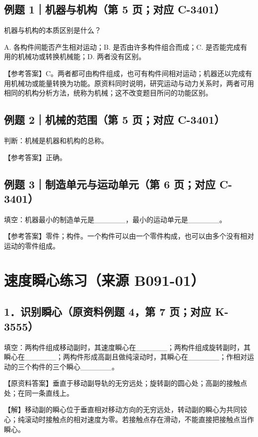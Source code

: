 \documentclass[zihao=5,a4paper,UTF8,fontset=fandol]{ctexart}
\begin{document}
\subsection{例题 1｜机器与机构（第 5 页；对应 C-3401）}

机器与机构的本质区别是什么？


A. 各构件间能否产生相对运动；B. 是否由许多构件组合而成；C. 是否能完成有用的机械功或转换机械能；D. 两者没有区别。


【参考答案】C。两者都可由构件组成，也可有构件间相对运动；机器还以完成有用机械功或能量转换为功能。原资料同时说明，研究运动与动力关系时，两者可用相同的机构分析方法，统称为机械；这不改变题目所问的功能区别。


\subsection{例题 2｜机械的范围（第 5 页；对应 C-3401）}

判断：机械是机器和机构的总称。


【参考答案】正确。


\subsection{例题 3｜制造单元与运动单元（第 6 页；对应 C-3401）}

填空：机器最小的制造单元是\_\_\_\_\_\_，最小的运动单元是\_\_\_\_\_\_。


【参考答案】零件；构件。一个构件可以由一个零件构成，也可以由多个没有相对运动的零件组成。


\section{速度瞬心练习（来源 B091-01）}

\subsection{1．识别瞬心（原资料例题 4，第 7 页；对应 K-3555）}

填空：两构件组成移动副时，其速度瞬心在\_\_\_\_\_\_；两构件组成旋转副时，其瞬心在\_\_\_\_\_\_；两构件形成高副且做纯滚动时，其瞬心在\_\_\_\_\_\_；作相对运动的三个构件的三个瞬心\_\_\_\_\_\_。


【原资料答案】垂直于移动副导轨的无穷远处；旋转副的圆心处；高副的接触点处；在同一条直线上。


【解】移动副的瞬心位于垂直相对移动方向的无穷远处，转动副的瞬心为共同铰心；纯滚动时接触点的相对速度为零。若接触点存在滑动，不能直接把接触点当作瞬心。
\end{document}
